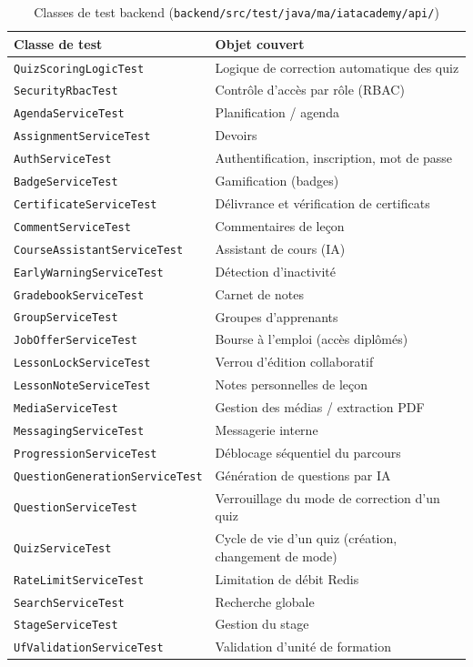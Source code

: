 \begin{table}[H]
  \centering
  \caption{Classes de test backend (\texttt{backend/src/test/java/ma/iatacademy/api/})}
  \label{tab:tests-backend}
  \begin{tabular}{|p{6cm}|p{8cm}|}
    \toprule
    Classe de test & Objet couvert \\
    \midrule
    \texttt{QuizScoringLogicTest} & Logique de correction automatique des quiz \\ \hline
    \texttt{SecurityRbacTest} & Contrôle d'accès par rôle (RBAC) \\ \hline
    \texttt{AgendaServiceTest} & Planification / agenda \\ \hline
    \texttt{AssignmentServiceTest} & Devoirs \\ \hline
    \texttt{AuthServiceTest} & Authentification, inscription, mot de passe \\ \hline
    \texttt{BadgeServiceTest} & Gamification (badges) \\ \hline
    \texttt{CertificateServiceTest} & Délivrance et vérification de certificats \\ \hline
    \texttt{CommentServiceTest} & Commentaires de leçon \\ \hline
    \texttt{CourseAssistantServiceTest} & Assistant de cours (IA) \\ \hline
    \texttt{EarlyWarningServiceTest} & Détection d'inactivité \\ \hline
    \texttt{GradebookServiceTest} & Carnet de notes \\ \hline
    \texttt{GroupServiceTest} & Groupes d'apprenants \\ \hline
    \texttt{JobOfferServiceTest} & Bourse à l'emploi (accès diplômés) \\ \hline
    \texttt{LessonLockServiceTest} & Verrou d'édition collaboratif \\ \hline
    \texttt{LessonNoteServiceTest} & Notes personnelles de leçon \\ \hline
    \texttt{MediaServiceTest} & Gestion des médias / extraction PDF \\ \hline
    \texttt{MessagingServiceTest} & Messagerie interne \\ \hline
    \texttt{ProgressionServiceTest} & Déblocage séquentiel du parcours \\ \hline
    \texttt{Question\allowbreak Generation\allowbreak Service\allowbreak Test} & Génération de questions par IA \\ \hline
    \texttt{QuestionServiceTest} & Verrouillage du mode de correction d'un quiz \\ \hline
    \texttt{QuizServiceTest} & Cycle de vie d'un quiz (création, changement de mode) \\ \hline
    \texttt{RateLimitServiceTest} & Limitation de débit Redis \\ \hline
    \texttt{SearchServiceTest} & Recherche globale \\ \hline
    \texttt{StageServiceTest} & Gestion du stage \\ \hline
    \texttt{UfValidationServiceTest} & Validation d'unité de formation \\
    \bottomrule
  \end{tabular}
\end{table}
